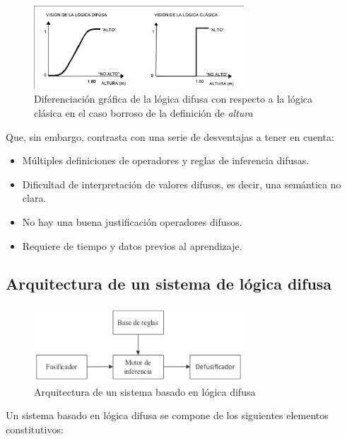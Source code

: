 \documentclass[a4paper, 11pt, titlepage]{article}
\begin{document}
    \begin{figure}[htp]
        \centering
        \includegraphics[width=0.7\textwidth]{resources/logicadifusa2.jpg}
        \caption{Diferenciación gráfica de la lógica difusa con respecto a la lógica clásica en el 
        caso borroso de la definición de \textit{altura}}
        \label{logicadifusa2}
    \end{figure}

    Que, sin embargo, contrasta con una serie de desventajas a tener en cuenta:

    \begin{itemize}
        \item Múltiples definiciones de operadores y reglas de inferencia difusas.
        \item Dificultad de interpretación de valores difusos, es decir, una semántica no clara.
        \item No hay una buena justificación operadores difusos.
        \item Requiere de tiempo y datos previos al aprendizaje.
    \end{itemize}

    \subsection{Arquitectura de un sistema de lógica difusa}

        \begin{figure}[htp]
            \centering
            \includegraphics[width=0.7\textwidth]{resources/logicadifusa.png}
            \caption{Arquitectura de un sistema basado en lógica difusa}
            \label{logicadifusa}
        \end{figure}

        Un sistema basado en lógica difusa se compone de los siguientes elementos constitutivos:
\end{document}
